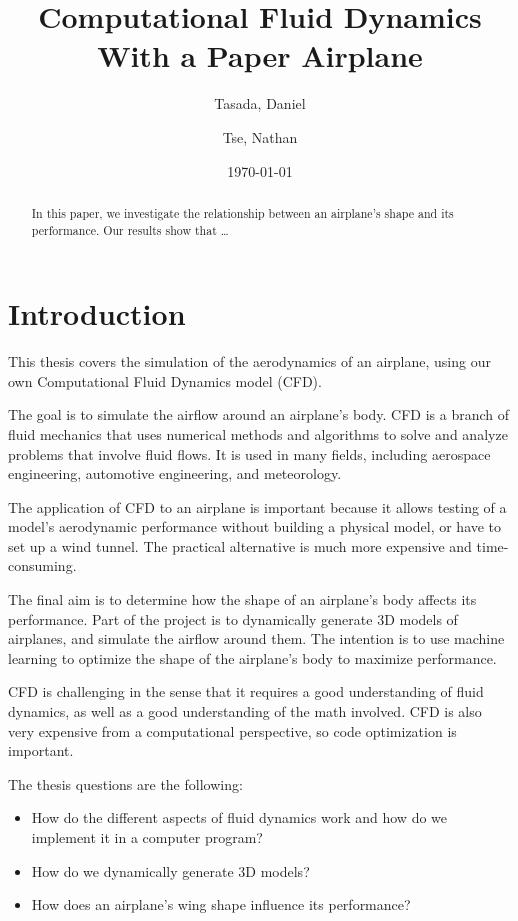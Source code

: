 \documentclass[a4paper,12pt]{article}
\title{Computational Fluid Dynamics With a Paper Airplane}
\author{
  Tasada, Daniel\\
  \and
  Tse, Nathan\\
}
\date{\today}
\begin{document}
\maketitle

\pagebreak
\begin{abstract}
	In this paper, we investigate the relationship between an airplane's shape
	and its performance. Our results show that \dots
\end{abstract}

\pagebreak
\tableofcontents
\pagebreak

\section{Introduction}
This thesis covers the simulation of the aerodynamics of an airplane, using
our own Computational Fluid Dynamics model (CFD).

The goal is to simulate the airflow around an airplane's body. CFD is a
branch of fluid mechanics that uses numerical methods and algorithms to solve
and analyze problems that involve fluid flows. It is used in many fields,
including aerospace engineering, automotive engineering, and meteorology.

The application of CFD to an airplane is important because it allows testing
of a model's aerodynamic performance without building a physical model, or
have to set up a wind tunnel. The practical alternative is much more expensive
and time-consuming.

The final aim is to determine how the shape of an airplane's body affects its
performance. Part of the project is to dynamically generate 3D models of
airplanes, and simulate the airflow around them. The intention is to use
machine learning to optimize the shape of the airplane's body to maximize
performance.

CFD is challenging in the sense that it requires a good understanding of fluid
dynamics, as well as a good understanding of the math involved. CFD is also
very expensive from a computational perspective, so code optimization is important.

The thesis questions are the following:
\begin{itemize}
	\item{How do the different aspects of fluid dynamics work and how do we
		implement it in a computer program?}
	\item{How do we dynamically generate 3D models?}
	\item{How does an airplane's wing shape influence its performance?}
\end{itemize}
\pagebreak
\end{document}
